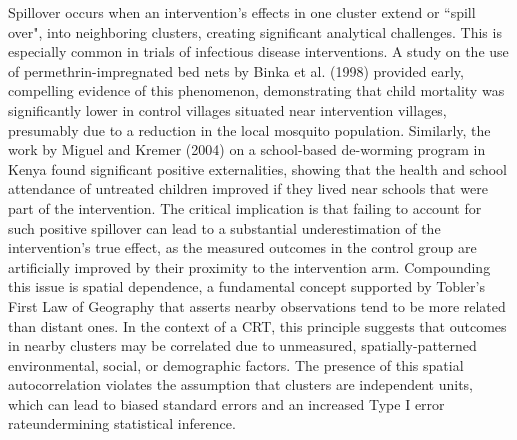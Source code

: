 \documentclass{article}[11pt]
\providecommand{\DIFaddtex}[1]{{\protect\color{blue}\uwave{#1}}} %
\providecommand{\DIFaddbegin}{} %
\providecommand{\DIFaddend}{} %
\providecommand{\DIFadd}[1]{\texorpdfstring{\DIFaddtex{#1}}{#1}} %
\providecommand{\DIFaddincludegraphics}[2][]{{\color{blue}\fbox{\DIFOincludegraphics[#1]{#2}}}} %
\DeclareRobustCommand{\DIFaddbegin}{\DIFOaddbegin \let\includegraphics\DIFaddincludegraphics} %
\DeclareRobustCommand{\DIFaddend}{\DIFOaddend \let\includegraphics\DIFOincludegraphics} %
\begin{document}
Spillover occurs when an intervention's effects in one cluster extend or ``spill over", into neighboring clusters, creating significant analytical challenges\cite{anayaizquierdo_spatial_2021}\cite{jarvis_spatial_2017}. This is especially common in trials of infectious disease interventions. A study on the use of permethrin-impregnated bed nets by Binka et al. (1998) provided early, compelling evidence of this phenomenon, demonstrating that child mortality was significantly lower in control villages situated near intervention villages, presumably due to a reduction in the local mosquito population\cite{binka_impact_1998}\cite{gimnig_effect_2003}\cite{hawley_community-wide_2003}. Similarly, the work by Miguel and Kremer (2004) on a school-based de-worming program in Kenya found significant positive externalities, showing that the health and school attendance of untreated children improved if they lived near schools that were part of the intervention\cite{miguel_worms_2004}. The critical implication is that failing to account for such positive spillover can lead to a substantial underestimation of the intervention's true effect, as the measured outcomes in the control group are artificially improved by their proximity to the intervention arm. Compounding this issue is spatial dependence, a fundamental concept supported by Tobler's First Law of Geography that asserts nearby observations tend to be more related than distant ones\cite{jarvis_spatial_2017}\cite{tobler_computer_1970}. In the context of a CRT, this principle suggests that outcomes in nearby clusters may be correlated due to unmeasured, spatially-patterned environmental, social, or demographic factors. The presence of this spatial autocorrelation violates the assumption that clusters are independent units, which can lead to biased standard errors and an increased Type I error rate\DIFaddbegin \DIFadd{, }\DIFaddend undermining statistical inference\cite{getis_history_2008}\cite{cressie_statistics_1993}\cite{tobler_computer_1970}.
\end{document}
